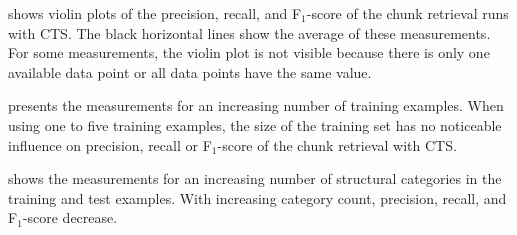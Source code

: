 \documentclass[10pt,journal,compsoc]{IEEEtran}
\begin{document}
 shows violin plots
of the precision,
recall, and F$_{1}$-score of the chunk retrieval runs with CTS.
The black horizontal lines show the average of these measurements.
For some measurements, the violin plot is not visible because there is
only one available data point or all data points have the same value.

 presents the
measurements for an
increasing number of training examples.
When using one to five
training examples, the size of the training set has no noticeable
influence on precision, recall or F$_{1}$-score of the chunk retrieval
with CTS.

 shows the
measurements for an increasing number of structural categories in the
training and test examples.
With increasing category count, precision,
recall, and F$_{1}$-score decrease.
\end{document}
